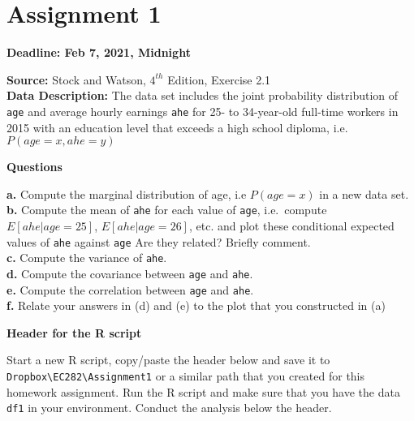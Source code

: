 \documentclass[
]{book}
\begin{document}
\hypertarget{assignment-1}{%
\section{Assignment 1}\label{assignment-1}}

\textbf{Deadline: Feb 7, 2021, Midnight}

\textbf{Source:} Stock and Watson, \(4^{th}\) Edition, Exercise 2.1\\
\textbf{Data Description:} The data set includes the joint probability distribution of \texttt{age} and average hourly earnings \texttt{ahe} for 25- to 34-year-old full-time workers in 2015 with an education level that exceeds a high school diploma, i.e.~\(P(age=x,ahe=y)\)

\textbf{Questions}

\textbf{a.} Compute the marginal distribution of age, i.e \(P(age=x)\) in a new data set.
\textbf{b.} Compute the mean of \texttt{ahe} for each value of \texttt{age}, i.e.~compute \(E[ahe|age=25]\),
\(E[ahe|age=26]\), etc. and plot these conditional expected values of \texttt{ahe} against \texttt{age} Are they related? Briefly comment.\\
\textbf{c.} Compute the variance of \texttt{ahe}.\\
\textbf{d.} Compute the covariance between \texttt{age} and \texttt{ahe}.\\
\textbf{e.} Compute the correlation between \texttt{age} and \texttt{ahe}.\\
\textbf{f.} Relate your answers in (d) and (e) to the plot that you constructed in (a)

\textbf{Header for the R script}

Start a new R script, copy/paste the header below and save it to \texttt{Dropbox\textbackslash{}EC282\textbackslash{}Assignment1} or a similar path that you created for this homework assignment. Run the R script and make sure that you have the data \texttt{df1} in your environment. Conduct the analysis below the header.
\end{document}
